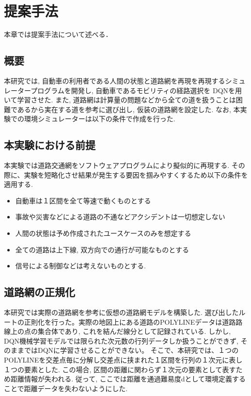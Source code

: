 \chapter{提案手法}
\label{proposed}

本章では提案手法について述べる．

\section{概要}

本研究では, 自動車の利用者である人間の状態と道路網を再現を再現するシミュレータープログラムを開発し, 自動車であるモビリティの経路選択を
DQNを用いて学習させた.
また, 道路網は計算量の問題などから全ての道を扱うことは困難であるから実在する道を参考に選び出し, 仮装の道路網を設定した.
なお, 本実験での環境シミュレーターは以下の条件で作成を行った.



\section{本実験における前提}

本実験では道路交通網をソフトウェアプログラムにより擬似的に再現する. その際に、実験を短略化させ結果が発生する要因を掴みやすくするため以下の条件を適用する.


\begin{itemize}
    \item 自動車は１区間を全て等速で動くものとする
    \item 事故や災害などによる道路の不通などアクシデントは一切想定しない
    \item 人間の状態は予め作成されたユースケースのみを想定する
    \item 全ての道路は上下線, 双方向での通行が可能なものとする
    \item 信号による制御などは考えないものとする.
\end{itemize}


\section{道路網の正規化}

本研究では実際の道路網を参考に仮想の道路網モデルを構築した.
選び出したルートの正則化を行った。実際の地図上にある道路のPOLYLINEデータは道路路線上の点の集合体であり, これを結んだ線分として記録されている. しかし, DQN機械学習モデルでは限られた次元数の行列データしか扱うことができず, そのままではDQNに学習させることができない。
そこで、本研究では、１つのPOLYLINEを交差点毎に分解し交差点に挟まれた１区間を行列の１次元に表し１つの要素とした.
この場合, 区間の距離に関わらず１次元の要素として表すため距離情報が失われる. 従って, ここでは距離を通過難易度dとして環境定義することで距離データを失わないようにした.

